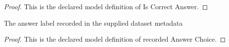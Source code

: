 \begin{proof}
  This is the declared model definition of Is Correct Answer.
\end{proof}
\begin{definition}
  \label{def:physics:phyx-mini-0186:phyxminiproblems-problemphyxmini0186-recordedanswerchoice}
  The answer label recorded in the supplied dataset metadata
\end{definition}
\begin{proof}
  This is the declared model definition of recorded Answer Choice.
\end{proof}
